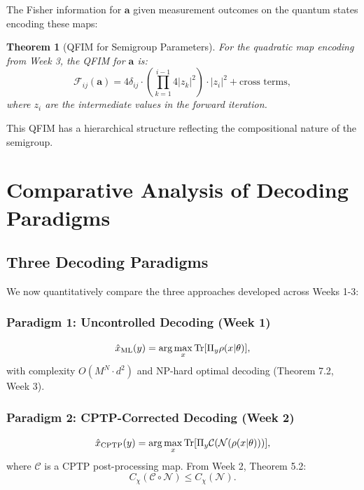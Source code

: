 \documentclass[12pt]{article}
\newtheorem{theorem}{Theorem}[section]
\begin{document}
The Fisher information for \(\mathbf{a}\) given measurement outcomes on the quantum states encoding these maps:

\begin{theorem}[QFIM for Semigroup Parameters]
For the quadratic map encoding from Week 3, the QFIM for \(\mathbf{a}\) is:
\begin{equation}
    \mathcal{F}_{ij}(\mathbf{a}) = 4\delta_{ij} \cdot \left(\prod_{k=1}^{i-1} 4|z_k|^2\right) \cdot |z_i|^2 + \text{cross terms},
\end{equation}
where \(z_i\) are the intermediate values in the forward iteration.
\end{theorem}

This QFIM has a hierarchical structure reflecting the compositional nature of the semigroup.

\section{Comparative Analysis of Decoding Paradigms}

\subsection{Three Decoding Paradigms}

We now quantitatively compare the three approaches developed across Weeks 1-3:

\subsubsection{Paradigm 1: Uncontrolled Decoding (Week 1)}
\begin{equation}
    \hat{x}_{\text{ML}}(y) = \arg\max_x \Tr[\Pi_y \rho(x|\theta)],
\end{equation}
with complexity \(O(M^N \cdot d^2)\) and NP-hard optimal decoding (Theorem 7.2, Week 3).

\subsubsection{Paradigm 2: CPTP-Corrected Decoding (Week 2)}
\begin{equation}
    \hat{x}_{\text{CPTP}}(y) = \arg\max_x \Tr[\Pi_y \mathcal{C}(\mathcal{N}(\rho(x|\theta)))],
\end{equation}
where \(\mathcal{C}\) is a CPTP post-processing map. From Week 2, Theorem 5.2:
\begin{equation}
    C_\chi(\mathcal{C}\circ\mathcal{N}) \leq C_\chi(\mathcal{N}).
\end{equation}
\end{document}
